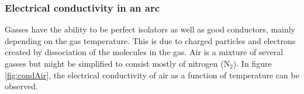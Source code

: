\documentclass[10pt,a4paper,twoside]{article}
\begin{document}

\subsubsection{Electrical conductivity in an arc} \label{sec:eleCondArc}
Gasses have the ability to be perfect isolators as well as good conductors, mainly depending on the gas temperature. This is due to charged particles and electrons created by dissociation of the molecules in the gas. Air is a mixture of several gasses but might be simplified to consist mostly of nitrogen (N$_2$). In figure \ref{fig:condAir}, the electrical conductivity of air as a function of temperature can be observed.   
\end{document}
